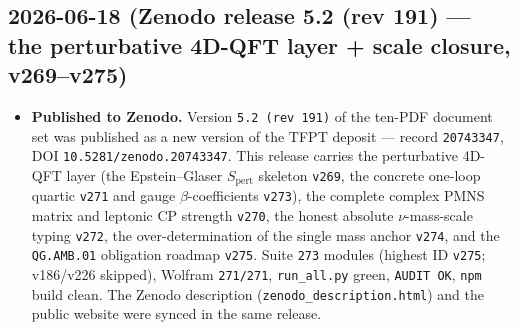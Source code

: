 \documentclass[11pt]{article}
\providecommand{\vref}[1]{\texttt{#1}}
\begin{document}
\subsection*{2026-06-18 (Zenodo release 5.2 (rev 191) --- the perturbative 4D-QFT layer + scale closure, v269--v275)}
\begin{itemize}
\item \textbf{Published to Zenodo.} Version \texttt{5.2 (rev 191)} of the ten-PDF document set was published
  as a new version of the TFPT deposit --- record \texttt{20743347}, DOI \texttt{10.5281/zenodo.20743347}.
  This release carries the perturbative 4D-QFT layer (the Epstein--Glaser $S_{\mathrm{pert}}$ skeleton
  \vref{v269}, the concrete one-loop quartic \vref{v271} and gauge $\beta$-coefficients \vref{v273}), the
  complete complex PMNS matrix and leptonic CP strength \vref{v270}, the honest absolute $\nu$-mass-scale
  typing \vref{v272}, the over-determination of the single mass anchor \vref{v274}, and the \texttt{QG.AMB.01}
  obligation roadmap \vref{v275}. Suite \texttt{273} modules (highest ID \texttt{v275}; v186/v226 skipped),
  Wolfram \texttt{271/271}, \texttt{run\_all.py} green, \texttt{AUDIT OK}, \texttt{npm} build clean. The Zenodo
  description (\texttt{zenodo\_description.html}) and the public website were synced in the same release.
\end{itemize}
\end{document}

